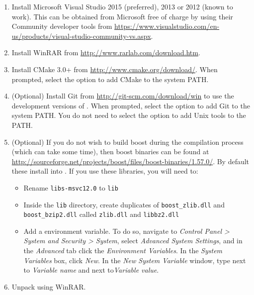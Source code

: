 \begin{enumerate}
  \item Install Microsoft Visual Studio 2015 (preferred), 2013 or 2012 (known to
  work). This can be obtained from Microsoft free of charge by using their
  Community developer tools from
  \url{https://www.visualstudio.com/en-us/products/visual-studio-community-vs.aspx}.
  \item Install WinRAR from \url{http://www.rarlab.com/download.htm}.
  \item Install CMake 3.0+ from \url{http://www.cmake.org/download/}. When
  prompted, select the option to add CMake to the system PATH.
  \item (Optional) Install Git from \url{http://git-scm.com/download/win} to use
  the development versions of \nekpp. When prompted, select the option to add
  Git to the system PATH. You do not need to select the option to add Unix tools
  to the PATH.
  \item (Optional) If you do not wish to build boost during the compilation
  process (which can take some time), then boost binaries can be found at
  \url{http://sourceforge.net/projects/boost/files/boost-binaries/1.57.0/}. By
  default these install into . If you use these libraries, you will need to:
  \begin{itemize}
    \item Rename \texttt{libs-msvc12.0} to \texttt{lib}
    \item Inside the \texttt{lib} directory, create duplicates of
    \texttt{boost\_zlib.dll} and \texttt{boost\_bzip2.dll} called
    \texttt{zlib.dll} and \texttt{libbz2.dll}
	\item Add a  environment variable. To do so,
	navigate to \emph{Control Panel > System and Security > System}, select
	\emph{Advanced System Settings}, and in the \emph{Advanced} tab click the
	\emph{Environment Variables}. In the \emph{System Variables} box, click
	\emph{New}. In the \emph{New System Variable} window, type 
	next to \emph{Variable name} and  next to\emph{Variable value}.
  \end{itemize}
  \item Unpack  using WinRAR.


\end{enumerate}
